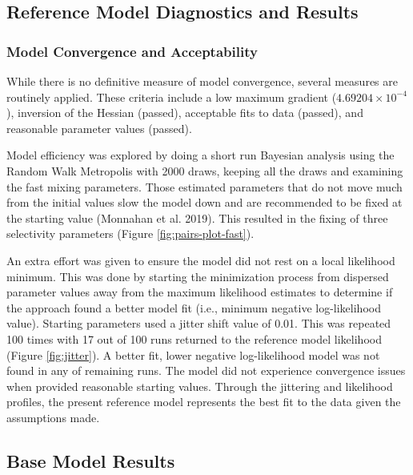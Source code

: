\documentclass[11pt,
  english,
  letterpaper,
]{article}
\begin{document}
\hypertarget{reference-model-diagnostics-and-results}{%
\subsection{Reference Model Diagnostics and Results}\label{reference-model-diagnostics-and-results}}

\hypertarget{model-convergence-and-acceptability}{%
\subsubsection{Model Convergence and Acceptability}\label{model-convergence-and-acceptability}}

While there is no definitive measure of model convergence, several measures are routinely applied. These criteria include a low maximum gradient (\ensuremath{4.69204\times 10^{-4}}), inversion of the Hessian (passed), acceptable fits to data (passed), and reasonable parameter values (passed).

Model efficiency was explored by doing a short run Bayesian analysis using the Random Walk Metropolis with 2000 draws, keeping all the draws and examining the fast mixing parameters. Those estimated parameters that do not move much from the initial values slow the model down and are recommended to be fixed at the starting value (Monnahan et al. 2019). This resulted in the fixing of three selectivity parameters (Figure \ref{fig:pairs-plot-fast}).

An extra effort was given to ensure the model did not rest on a local likelihood minimum. This was done by starting the minimization process from dispersed parameter values away from the maximum likelihood estimates to determine if the approach found a better model fit (i.e., minimum negative log-likelihood value). Starting parameters used a jitter shift value of 0.01. This was repeated 100 times with 17 out of 100 runs returned to the reference model likelihood (Figure \ref{fig:jitter}). A better fit, lower negative log-likelihood model was not found in any of remaining runs. The model did not experience convergence issues when provided reasonable starting values. Through the jittering and likelihood profiles, the present reference model represents the best fit to the data given the assumptions made.

\hypertarget{base-model-results}{%
\subsection{Base Model Results}\label{base-model-results}}
\end{document}
